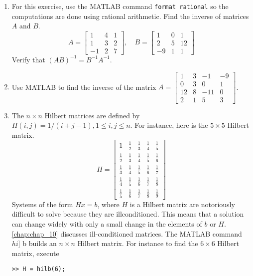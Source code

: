 \documentclass[../main.tex]{subfiles}
\begin{document}
\begin{enumerate}[label=\textbf{1.\arabic*}]
\addtocounter{enumi}{25}

\item For this exercise, use the MATLAB command \texttt{format rational} so the computations are done using rational arithmetic. Find the inverse of matrices $A$ and $B$.
$$
A=\left[\begin{array}{ccc}
1 & 4 & 1 \\
1 & 3 & 2 \\
-1 & 2 & 7
\end{array}\right], \quad B=\left[\begin{array}{ccc}
1 & 0 & 1 \\
2 & 5 & 12 \\
-9 & 1 & 1
\end{array}\right]
$$
Verify that $(A B)^{-1}=B^{-1} A^{-1}$.

\item Use MATLAB to find the inverse of the matrix $A=\left[\begin{array}{cccc}1 & 3 & -1 & -9 \\ 0 & 3 & 0 & 1 \\ 12 & 8 & -11 & 0 \\ 2 & 1 & 5 & 3\end{array}\right]$.


\item The $n \times n$ Hilbert matrices are defined by $H(i, j)=1 /(i+j-1), 1 \leq i, j \leq n .$ For instance, here is the $5 \times 5$ Hilbert matrix.
\label{pro:pro_1_28}
$$
H=\left[\begin{array}{ccccc}
1 & \frac{1}{2} & \frac{1}{3} & \frac{1}{4} & \frac{1}{5} \\
\frac{1}{2} & \frac{1}{3} & \frac{1}{4} & \frac{1}{5} & \frac{1}{6} \\
\frac{1}{3} & \frac{1}{4} & \frac{1}{5} & \frac{1}{6} & \frac{1}{7} \\
\frac{1}{4} & \frac{1}{5} & \frac{1}{6} & \frac{1}{7} & \frac{1}{8} \\
\frac{1}{5} & \frac{1}{6} & \frac{1}{7} & \frac{1}{8} & \frac{1}{9}
\end{array}\right]
$$
Systems of the form $H x=b$, where $H$ is a Hilbert matrix are notoriously difficult to solve because they are illconditioned. This means that a solution can change widely with only a small change in the elements of $b$ or $H .$ \autoref{chap:chap_10} discusses ill-conditioned matrices. The MATLAB command $h i]$ b builds an $n \times n$ Hilbert matrix. For instance to find the $6 \times 6$ Hilbert matrix, execute
	\begin{lstlisting}[numbers=none,frame=none]
	>> H = hilb(6);
	\end{lstlisting}


\end{enumerate}
\end{document}
